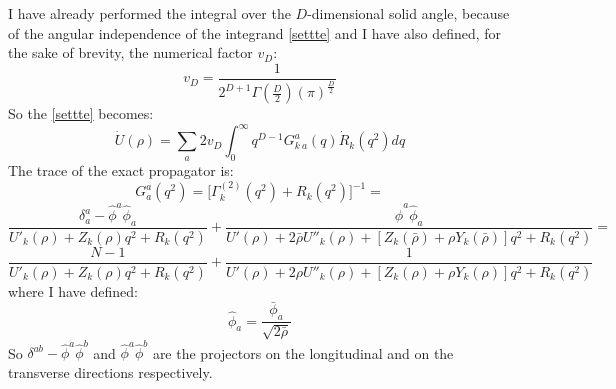 I have already performed the integral over the $D$-dimensional solid angle, because of the angular independence of the integrand \eqref{settte} and
I have also defined, for the sake of brevity, the numerical factor $v_D$:
$$v_D = \frac{1}{2^{D+1}\Gamma(\frac{D}{2})(\pi)^\frac{D}{2}}$$
So the  \eqref{settte} becomes:
\begin{equation}
\dot{U}(\rho) = \sum_{a} 2v_D \int_0^\infty q^{D-1}  {G}^{a}_{k\ a}(q)\dot{R}_k(q^2)dq
\end{equation}
The trace of the exact propagator is:
\begin{equation*}\label{uuu}
 {G}^a_a(q^2) = \Big[\Gamma^{(2)}_k(q^2) + R_k(q^2)\Big]^{-1} = 
\end{equation*}
$$\frac{\delta^a_{a} - \widehat{\phi}^{a}\widehat{\phi}_{a}}{U'_k(\rho) +  Z_k({\rho})q^2 + R_k(q^2) }  + \frac{\widehat{\phi}^{a}\widehat{\phi}_{a}}{ U'(\rho) +  2\bar{\rho}U''_k(\rho)+ [Z_k(\bar{\rho}) + {\rho}Y_k(\bar{\rho})]q^2 + R_k(q^2)} =$$
\begin{equation}\label{vvvvvv}
 \frac{N-1}{U'_k(\rho) +  Z_k({\rho})q^2 + R_k(q^2)}  + \frac{1}{U'(\rho) +  2{\rho}U''_k(\rho)+ [Z_k({\rho}) + {\rho}Y_k({\rho})]q^2 + R_k(q^2)} 
\end{equation}
where I have defined:
\begin{equation}
\widehat{\phi}_{a} = \frac{\bar{\phi}_{a}}{\sqrt{2\bar{\rho}}}
\end{equation}
So $\delta^{ab} - \widehat{\phi}^{a}\widehat{\phi}^{b}$ and $\widehat{\phi}^{a}\widehat{\phi}^{b}$ are the projectors on the longitudinal and on the transverse directions respectively.

